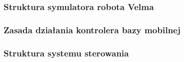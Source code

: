 \begin{frame}
    \frametitle{Struktura symulatora robota Velma} 
\end{frame}

\begin{frame}
    \frametitle{Zasada działania kontrolera bazy mobilnej} 
\end{frame}

\begin{frame}
    \frametitle{Struktura systemu sterowania} 
\end{frame}




